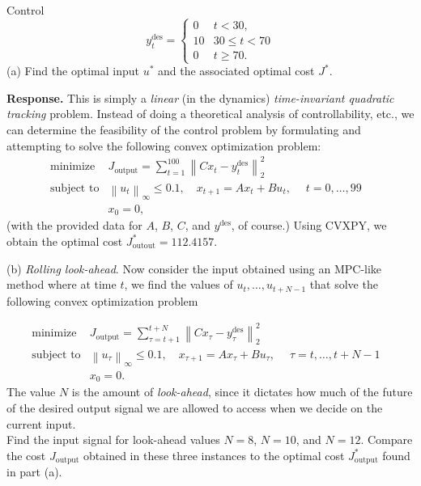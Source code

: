 \begin{chapter}{Control}
    \[y^{\text{des}}_t = \begin{cases}
        0 & t < 30, \\
        10 & 30 \le t < 70 \\
        0 & t \ge 70.
    \end{cases}\]
    (a) Find the optimal input $u^*$ and the associated optimal cost $J^*$.
    
    \vspace{.1cm}
    \noindent \textbf{Response.} This is simply a \textit{linear} (in the dynamics) \textit{time-invariant quadratic tracking} problem.
    Instead of doing a theoretical analysis of controllability, etc., we can determine the feasibility
    of the control problem by formulating and attempting to solve the following convex optimization problem:
    \[\begin{array}{lll}
    \text{minimize} \; & J_{\text{output}} = \sum_{t=1}^{100}\left\lVert Cx_t - y_t^{\text{des}} \right\rVert_{2}^2 & \\
    \text{subject to} & \left\lVert u_t \right\rVert_{\infty} \le 0.1, \quad x_{t+1} = Ax_t + Bu_t, \; \quad t = 0, \ldots, 99 & \\
    &x_0 = 0,
    \end{array}\]
    (with the provided data for $A$, $B$, $C$, and $y^{\text{des}}$, of course.) Using CVXPY, we obtain the optimal cost 
    $J_{\text{outout}}^{*} = 112.4157$.

    \vspace{.1cm}
    \noindent (b) \textit{Rolling look-ahead}. Now consider the input obtained using an MPC-like method
    where at time $t$, we find the values of $u_t, \ldots, u_{t+N-1}$ that solve the following convex optimization
    problem

    \[\begin{array}{lll}
        \text{minimize} \; & J_{\text{output}} =  \sum_{\tau=t+1}^{t+N}\left\lVert Cx_\tau - y_\tau^{\text{des}} \right\rVert_{2}^2 & \\
        \text{subject to} & \left\lVert u_\tau \right\rVert_{\infty} \le 0.1, \quad x_{\tau+1} = Ax_\tau + Bu_\tau, \; \quad \tau = t, \ldots, t + N - 1 & \\
        &x_0 = 0.
        \end{array}\]
    The value $N$ is the amount of \textit{look-ahead}, since it dictates how much of the future of the desired
    output signal we are allowed to access when we decide on the current input.\\
    Find the input signal for look-ahead values $N=8$, $N=10$, and $N=12$. Compare the cost $J_{\text{output}}$
    obtained in these three instances to the optimal cost $J_{\text{output}}^{*}$ found in part (a).
    

\end{chapter}
